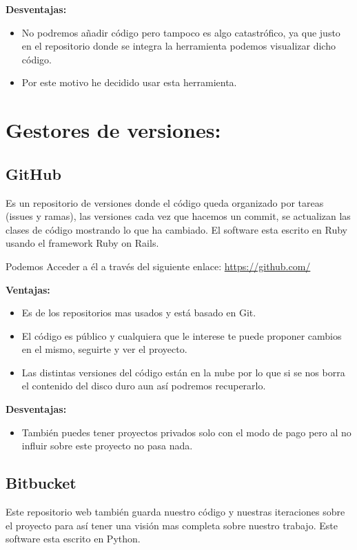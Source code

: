 \textbf{Desventajas:}

\begin{itemize}
\item No podremos añadir código pero tampoco es algo catastrófico, ya que justo en el repositorio donde se integra la herramienta podemos visualizar dicho código.

\item Por este motivo he decidido usar esta herramienta.
\end{itemize}

\section{Gestores de versiones:}
\subsection{GitHub}
Es un repositorio de versiones donde el código queda organizado por tareas (issues y ramas), las versiones cada vez que hacemos un commit, se actualizan las clases de código mostrando lo que ha cambiado.
El software esta escrito en Ruby usando el framework Ruby on Rails.

Podemos Acceder a él a través del siguiente enlace: 
\url{https://github.com/}



\textbf{Ventajas:}

\begin{itemize}
\item Es de los repositorios mas usados y está basado en Git.

\item El código es público y cualquiera que le interese te puede proponer cambios en el mismo, seguirte y ver el proyecto.

\item Las distintas versiones del código están en la nube por lo que si se nos borra el contenido del disco duro aun así podremos recuperarlo.
\end{itemize}

\textbf{Desventajas:}

\begin{itemize}
\item También puedes tener proyectos privados solo con el modo de pago pero al no influir sobre este proyecto no pasa nada.
\end{itemize}


\subsection{Bitbucket}
Este repositorio web también guarda nuestro código y nuestras iteraciones sobre el proyecto para así tener una visión mas completa sobre nuestro trabajo.
Este software esta escrito en Python.

